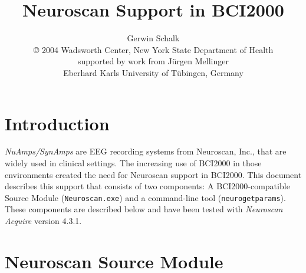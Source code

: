 \documentclass[letterpaper, oneside, 12pt]{article}
\begin{document}
%
\title{Neuroscan Support in BCI2000}
\author{Gerwin Schalk\\ \small{\copyright{} 2004 Wadsworth Center, New York State Department of Health}\\ \small{supported by work from J\"{u}rgen Mellinger}\\ \small{Eberhard Karls University of T\"{u}bingen, Germany}}
\maketitle

\tableofcontents

\newpage


\section{Introduction}

\sloppypar \emph{NuAmps/SynAmps} are EEG recording systems from Neuroscan, Inc., that are 
widely used in clinical settings. The increasing use of BCI2000 in those 
environments created the need for Neuroscan support in BCI2000. This document 
describes this support that consists of two components: A BCI2000-compatible 
Source Module (\texttt{Neuroscan.exe}) and a command-line tool 
(\texttt{neurogetparams}). These components are described below and have been 
tested with \emph{Neuroscan Acquire} version 4.3.1.


\section{Neuroscan Source Module}
\end{document}
